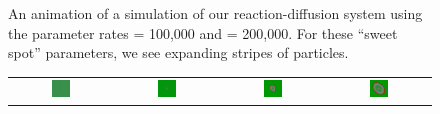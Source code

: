 \begin{figure}[h]
\begin{tabular}{c c c c}
\end{tabular}
\caption{An animation of a simulation of our reaction-diffusion system using the parameter rates  = 100,000 and  = 200,000. For these ``sweet spot'' parameters, we see expanding stripes of  particles.}
\label{fig:k=200000_f=100000}
\end{figure}

\begin{figure}[h]
\centering
\mySfFamily
\begin{tabular}{c c c c}
\includegraphics[width = 0.19\textwidth]{../images/predator_prey_11_by_11_f_1.4_k_2} & \includegraphics[width = 0.19\textwidth]{../images/../images/predator_prey_11_by_11_f_1.4_k_2_i1} & \includegraphics[width = 0.19\textwidth]{../images/../images/predator_prey_11_by_11_f_1.4_k_2_i2} & \includegraphics[width = 0.19\textwidth]{../images/../images/predator_prey_11_by_11_f_1.4_k_2_i3}\\[2ex]

\end{tabular}
\end{figure}
